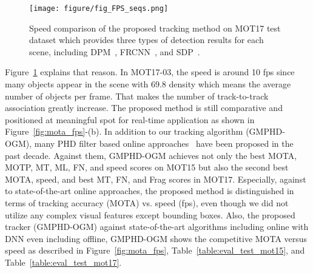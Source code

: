\documentclass[journal]{IEEEtran}
\newcounter{ct}
\begin{document}
\begin{figure}[t]
\centering
\texttt{[image: figure/fig\_FPS\_seqs.png]}
\caption{Speed comparison of the proposed tracking method on MOT17 test dataset which provides three types of detection results for each scene, including DPM~\cite{dpm}, FRCNN~\cite{frcnn}, and SDP~\cite{sdp}.}
\label{fig:fps_scene}
\end{figure}
Figure~\ref{fig:fps_scene} explains that reason. In MOT17-03, the speed is around 10 fps since many objects appear in the scene with 69.8 density which means the average number of objects per frame. That makes the number of track-to-track association greatly increase.
The proposed method is still comparative and positioned at meaningful spot for real-time application as shown in Figure~\ref{fig:mota_fps}-(b).
In addition to our tracking algorithm (GMPHD-OGM), many PHD filter based online approaches~\cite{fu1, mtdf, prev1, eamtt, gmphdn1tr, gmphdkcf, gmphd2012} have been proposed in the past decade. Against them, GMPHD-OGM achieves not only the best MOTA, MOTP, MT, ML, FN, and speed scores on MOT15 but also the second best MOTA, speed, and best MT, FN, and Frag scores in MOT17.
Especially, against to state-of-the-art online approaches, the proposed method is distinguished in terms of tracking accuracy (MOTA) vs. speed (fps), even though we did not utilize any complex visual features except bounding boxes.
Also, the proposed tracker (GMPHD-OGM) against state-of-the-art algorithms including online with DNN even including offline, GMPHD-OGM shows the competitive MOTA versus speed as described in Figure~\ref{fig:mota_fps}, Table~\ref{table:eval_test_mot15}, and Table~\ref{table:eval_test_mot17}.
\end{document}
